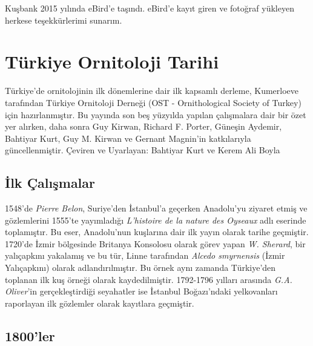 \documentclass[
  a4paper,
  DIV=11,
  numbers=noendperiod]{scrartcl}
\begin{document}
Kuşbank 2015 yılında eBird'e taşındı. eBird'e kayıt giren ve fotoğraf
yükleyen herkese teşekkürlerimi sunarım.


\chapter*{Türkiye Ornitoloji Tarihi}\label{tuxfcrkiye-ornitoloji-tarihi}


Türkiye'de ornitolojinin ilk dönemlerine dair ilk kapsamlı derleme,
Kumerloeve tarafından Türkiye Ornitoloji Derneği (OST - Ornithological
Society of Turkey) için hazırlanmıştır. Bu yayında son beş yüzyılda
yapılan çalışmalara dair bir özet yer alırken, daha sonra Guy Kirwan,
Richard F. Porter, Güneşin Aydemir, Bahtiyar Kurt, Guy M. Kirwan ve
Gernant Magnin'in katkılarıyla güncellenmiştir. Çeviren ve Uyarlayan:
Bahtiyar Kurt ve Kerem Ali Boyla

\section*{İlk Çalışmalar}\label{ilk-uxe7alux131ux15fmalar}


1548'de \emph{Pierre Belon}, Suriye'den İstanbul'a geçerken Anadolu'yu
ziyaret etmiş ve gözlemlerini 1555'te yayımladığı \emph{L'histoire de la
nature des Oyseaux} adlı eserinde toplamıştır. Bu eser, Anadolu'nun
kuşlarına dair ilk yayın olarak tarihe geçmiştir. 1720'de İzmir
bölgesinde Britanya Konsolosu olarak görev yapan \emph{W. Sherard}, bir
yalıçapkını yakalamış ve bu tür, Linne tarafından \emph{Alcedo
smyrnensis} (İzmir Yalıçapkını) olarak adlandırılmıştır. Bu örnek aynı
zamanda Türkiye'den toplanan ilk kuş örneği olarak kaydedilmiştir.
1792-1796 yılları arasında \emph{G.A. Oliver}'in gerçekleştirdiği
seyahatler ise İstanbul Boğazı'ndaki yelkovanları raporlayan ilk
gözlemler olarak kayıtlara geçmiştir.

\section*{1800'ler}\label{ler}

\end{document}
